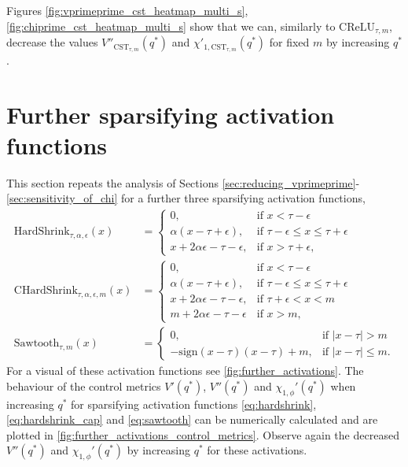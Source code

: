 \documentclass{article}
\theoremstyle{plain}
\theoremstyle{definition}
\theoremstyle{remark}
\begin{document}
Figures \ref{fig:vprimeprime_cst_heatmap_multi_s}, \ref{fig:chiprime_cst_heatmap_multi_s} show that we can, similarly to $\text{CReLU}_{\tau, m}$, decrease the values $V''_{\text{CST}_{\tau, m}}(q^*)$ and $ \chi'_{1, \text{CST}_{\tau, m}}(q^*)$ for fixed $m$ by increasing $q^*$.
\section{Further sparsifying activation functions}{\label{app:further_sparsifying_activations}}

This section repeats the analysis of Sections \ref{sec:reducing_vprimeprime}-\ref{sec:sensitivity_of_chi} for a further three sparsifying activation functions,
\begin{align}
    \label{eq:hardshrink}
            \text{HardShrink}_{\tau, \alpha, \epsilon}(x) &=
            \begin{cases}
            0, & \text{if $x<\tau-\epsilon$}\\
            \alpha(x-\tau+\epsilon), & \text{if $\tau-\epsilon \leq x \leq \tau+\epsilon$}\\
            x+2\alpha \epsilon - \tau - \epsilon, & \text{if $x>\tau+\epsilon$},
            \end{cases}\\
    \label{eq:hardshrink_cap}
            \text{CHardShrink}_{\tau, \alpha, \epsilon, m}(x) &=
            \begin{cases}
            0, & \text{if $x<\tau-\epsilon$}\\
            \alpha(x-\tau+\epsilon), & \text{if $\tau-\epsilon \leq x \leq \tau+\epsilon$}\\
            x+2\alpha \epsilon - \tau - \epsilon, & \text{if $\tau+\epsilon< x<m$}\\
            m+2\alpha \epsilon - \tau - \epsilon & \text{if $x>m$},
            \end{cases}\\
    \label{eq:sawtooth}
\text{Sawtooth}_{\tau, m}(x) &=
            \begin{cases}
            0, & \text{if $|x-\tau|>m$}\\
            -\text{sign}(x-\tau)(x-\tau)+m, & \text{if $|x-\tau|\leq m$}.
            \end{cases}
\end{align}
For a visual of these activation functions see \cref{fig:further_activations}.
The behaviour of the control metrics $V'(q^*)$, $V''(q^*)$ and $\chi_{1, \phi}'(q^*)$ when increasing $q^*$ for sparsifying activation functions \eqref{eq:hardshrink}, \eqref{eq:hardshrink_cap} and \eqref{eq:sawtooth} can be numerically calculated and are plotted in \cref{fig:further_activations_control_metrics}. Observe again the decreased $V''(q^*)$ and $\chi_{1, \phi}'(q^*)$ by increasing $q^*$ for these activations.
\end{document}
